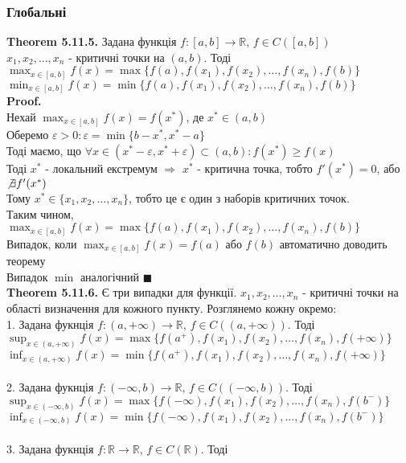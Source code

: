 \documentclass[a4paper, 14pt]{extarticle}
\def\huge{\displaystyle}
\def\bigline{\vspace{5mm}\\}
\def\th#1{\textbf{Theorem {#1}}}
\def\proof{\textbf{Proof.}\\}
\def\bigline{\vspace{5mm}\\}
\def\qed{$\blacksquare$}
\begin{document}
\subsubsection{Глобальні}
\th{5.11.5.} Задана функція $f: [a,b] \to \mathbb{R}$, $f \in C([a,b])$\\
$x_1,x_2,\dots,x_n$ - критичні точки на $(a,b)$. Тоді\\
$\huge \max_{x \in [a,b]} f(x) = \max\{f(a),f(x_1),f(x_2),\dots,f(x_n),f(b)\}$\\
$\huge \min_{x \in [a,b]} f(x) = \min\{f(a),f(x_1),f(x_2),\dots,f(x_n),f(b)\}$\\
\proof
Нехай $\huge \max_{x \in [a,b]} f(x) = f(x^*)$, де $x^* \in (a,b)$\\
Оберемо $\varepsilon > 0: \varepsilon = \min\{b-x^*, x^*-a\}$\\
Тоді маємо, що $\forall x \in (x^*-\varepsilon, x^*+\varepsilon) \subset (a,b): f(x^*) \geq f(x)$\\
Тоді $x^*$ - локальний екстремум $\Rightarrow$ $x^*$ - критична точка, тобто $f'(x^*)=0$, або $\not\exists f'(x^*)$\\
Тому $x^* \in \{x_1,x_2,\dots,x_n\}$, тобто це є один з наборів критичних точок.\\
Таким чином, $\huge \max_{x \in [a,b]} f(x) = \max\{f(a),f(x_1),f(x_2),\dots,f(x_n),f(b)\}$\\
Випадок, коли $\huge \max_{x \in [a,b]} f(x) = f(a) \textrm{ або } f(b)$ автоматично доводить теорему\\
Випадок $\min$ аналогічний \qed
\bigline
\th{5.11.6.} Є три випадки для функції. $x_1,x_2,\dots,x_n$ - критичні точки на області визначення для кожного пункту. Розглянемо кожну окремо:\\
1. Задана фукнція $f: (a,+\infty) \to \mathbb{R}$, $f \in C((a,+\infty))$. Тоді\\
$\huge \sup_{x \in (a,+\infty)} f(x) = \max\{f(a^+),f(x_1),f(x_2),\dots,f(x_n),f(+\infty)\}$\\
$\huge \inf_{x \in (a,+\infty)} f(x) = \min\{f(a^+),f(x_1),f(x_2),\dots,f(x_n),f(+\infty)\}$\\
\bigline
2. Задана фукнція $f: (-\infty,b) \to \mathbb{R}$, $f \in C((-\infty,b))$. Тоді\\
$\huge \sup_{x \in (-\infty,b)} f(x) = \max\{f(-\infty),f(x_1),f(x_2),\dots,f(x_n),f(b^-)\}$\\
$\huge \inf_{x \in (-\infty,b)} f(x) = \min\{f(-\infty),f(x_1),f(x_2),\dots,f(x_n),f(b^-)\}$\\
\bigline
3. Задана фукнція $f: \mathbb{R} \to \mathbb{R}$, $f \in C(\mathbb{R})$. Тоді\\
\end{document}
